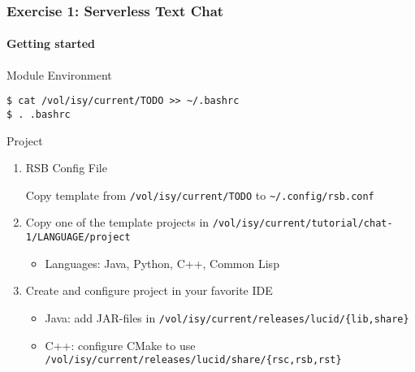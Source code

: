 \documentclass[8pt, presentation]{beamer}
\begin{document}
\begin{frame}
\frametitle{Exercise 1: Serverless Text Chat}
\framesubtitle{Getting started}
\label{sec-2}
\begin{block}{Module Environment}
\label{sec-2-1}


\lstset{language=sh}
\begin{lstlisting}
$ cat /vol/isy/current/TODO >> ~/.bashrc
$ . .bashrc
\end{lstlisting}
\end{block}
\begin{block}{Project}
\label{sec-2-2}

\begin{enumerate}
\item RSB Config File

      Copy template from \texttt{/vol/isy/current/TODO} to \texttt{\textasciitilde{}/.config/rsb.conf}
\item Copy one of the template projects in
      \texttt{/vol/isy/current/tutorial/chat-1/LANGUAGE/project}
\begin{itemize}
\item Languages: Java, Python, C++, Common Lisp
\end{itemize}
\item Create and configure project in your favorite IDE
\begin{itemize}
\item Java: add JAR-files in \texttt{/vol/isy/current/releases/lucid/\{lib,share\}}
\item C++: configure CMake to use
        \texttt{/vol/isy/current/releases/lucid/share/\{rsc,rsb,rst\}}
\end{itemize}
\end{enumerate}
\end{block}
\end{frame}
\end{document}
